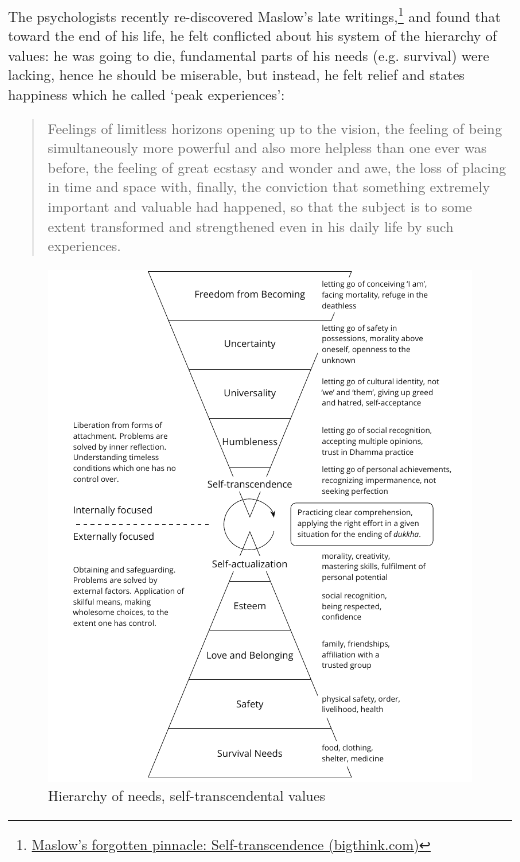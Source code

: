 The psychologists recently re-discovered Maslow's late
writings,\footnote{\href{https://bigthink.com/neuropsych/maslow-self-transcendence/}{Maslow's
  forgotten pinnacle: Self-transcendence (bigthink.com)}} and found that
toward the end of his life, he felt conflicted about his system of the
hierarchy of values: he was going to die, fundamental parts of his needs
(e.g. survival) were lacking, hence he should be miserable, but instead,
he felt relief and states happiness which he called `peak experiences':

\begin{quote}
Feelings of limitless horizons opening up to the vision, the feeling of
being simultaneously more powerful and also more helpless than one ever
was before, the feeling of great ecstasy and wonder and awe, the loss of
placing in time and space with, finally, the conviction that something
extremely important and valuable had happened, so that the subject is to
some extent transformed and strengthened even in his daily life by such
experiences.
\end{quote}

\clearpage
\figurepagelayout

\begin{figure}[h]
\caption{Hierarchy of needs, self-transcendental values}\label{fig-self-transcendental}
\bigskip
\includegraphics[width=\linewidth]{./manuscript/tex/diagrams/self-transcendental-values.pdf}
\end{figure}

